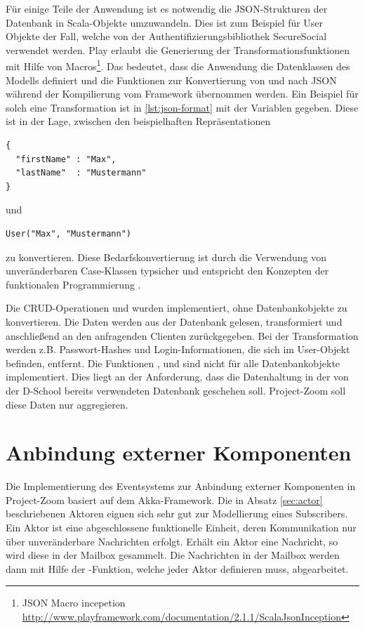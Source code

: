 

Für einige Teile der Anwendung ist es notwendig die JSON-Strukturen der Datenbank in Scala-Objekte umzuwandeln. Dies ist zum Beispiel für User Objekte der Fall, welche von der Authentifizierungsbibliothek SecureSocial verwendet werden. Play erlaubt die Generierung der Transformationsfunktionen mit Hilfe von Macros\footnote{JSON Macro incepetion \url{http://www.playframework.com/documentation/2.1.1/ScalaJsonInception}}. Das bedeutet, dass die Anwendung die Datenklassen des Modells definiert und die Funktionen zur Konvertierung von und nach JSON während der Kompilierung vom Framework übernommen werden. Ein Beispiel für solch eine Transformation ist in \ref{lst:json-format} mit der Variablen  gegeben. Diese ist in der Lage, zwischen den beispielhaften Repräsentationen 
\begin{lstlisting} 
{ 
  "firstName" : "Max", 
  "lastName"  : "Mustermann" 
}
\end{lstlisting} und 
\begin{lstlisting} 
User("Max", "Mustermann")
\end{lstlisting} 
zu konvertieren. Diese Bedarfskonvertierung ist durch die Verwendung von unveränderbaren Case-Klassen typsicher und entspricht den Konzepten der funktionalen Programmierung \cite{functional-thinking}.

Die CRUD-Operationen  und  wurden implementiert, ohne Datenbankobjekte zu konvertieren. Die Daten werden aus der Datenbank gelesen, transformiert und anschließend an den anfragenden Clienten zurückgegeben. Bei der Transformation werden z.B. Passwort-Hashes und Login-Informationen, die sich im User-Objekt befinden, entfernt. Die Funktionen ,  und  sind nicht für alle Datenbankobjekte implementiert. Dies liegt an der Anforderung, dass die Datenhaltung in der von der D-School bereits verwendeten Datenbank geschehen soll. Project-Zoom soll diese Daten nur aggregieren.


\section{Anbindung externer Komponenten}

Die Implementierung des Eventsystems zur Anbindung externer Komponenten in Project-Zoom basiert auf dem Akka-Framework. Die in Absatz \ref{sec:actor} beschriebenen Aktoren eignen sich sehr gut zur Modellierung eines Subscribers. Ein Aktor ist eine abgeschlossene funktionelle Einheit, deren Kommunikation nur über unveränderbare Nachrichten erfolgt. Erhält ein Aktor eine Nachricht, so wird diese in der Mailbox gesammelt. Die Nachrichten in der Mailbox werden dann mit Hilfe der -Funktion, welche jeder Aktor definieren muss, abgearbeitet. 

